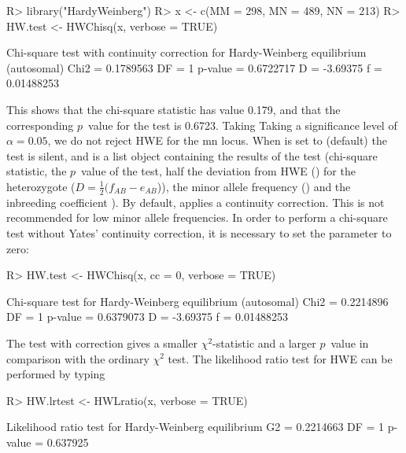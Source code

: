 \documentclass[nojss]{jss}
\begin{document}
\begin{Schunk}
\begin{Sinput}
R> library("HardyWeinberg")
R> x <- c(MM = 298, MN = 489, NN = 213)
R> HW.test <- HWChisq(x, verbose = TRUE)
\end{Sinput}
\begin{Soutput}
Chi-square test with continuity correction for Hardy-Weinberg equilibrium (autosomal)
Chi2 =  0.1789563 DF =  1 p-value =  0.6722717 D =  -3.69375 f =  0.01488253 
\end{Soutput}
\end{Schunk}

%
This shows that the chi-square statistic has value 0.179, and that the corresponding 
$p$~value for 
the test is 0.6723. Taking 
Taking a significance
level of $\alpha = 0.05$, we do not reject HWE for the {\sc mn}
locus. When  is set to  (default) the test
is silent, and  is a list object containing the results
of the test (chi-square statistic, the $p$~value of the test, half the
deviation from HWE () for the heterozygote ($D = \frac{1}{2}
(f_{AB} - e_{AB}$)), the minor allele frequency () and the
inbreeding coefficient ).  By default,  applies
a continuity correction. This is not recommended for low minor allele
frequencies. In order to perform a chi-square test without Yates'
continuity correction, it is necessary to set the  parameter
to zero:
%

\begin{Schunk}
\begin{Sinput}
R> HW.test <- HWChisq(x, cc = 0, verbose = TRUE)
\end{Sinput}
\begin{Soutput}
Chi-square test for Hardy-Weinberg equilibrium (autosomal)
Chi2 =  0.2214896 DF =  1 p-value =  0.6379073 D =  -3.69375 f =  0.01488253 
\end{Soutput}
\end{Schunk}

%
The test with correction gives a smaller $\chi^2$-statistic and a
larger $p$~value in comparison with the ordinary $\chi^2$ test. The
likelihood ratio test for HWE can be performed by typing

\begin{Schunk}
\begin{Sinput}
R> HW.lrtest <- HWLratio(x, verbose = TRUE)
\end{Sinput}
\begin{Soutput}
Likelihood ratio test for Hardy-Weinberg equilibrium
G2 = 0.2214663 DF = 1 p-value = 0.637925 
\end{Soutput}
\end{Schunk}
\end{document}
